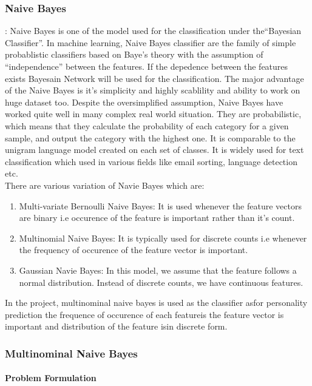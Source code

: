 \subsubsection{ Naive Bayes}: 
Naive Bayes is one of the model used for the classification under the``Bayesian Classifier''. In machine learning, Naive Bayes classifier are the family of simple probablistic classifiers based on Baye's theory with the assumption of ``independence'' between the features. If the depedence between the features exists Bayesain Network will be used for the classification. The major advantage of the Naive Bayes is it's simplicity and highly scablility and ability to work on huge dataset too. Despite the oversimplified assumption, Naive Bayes have worked quite well in many complex real world situation.
They are probabilistic, which means that they calculate the probability of each category for a given sample, and output the category with the highest one. It is comparable to the unigram language model created on each set of classes. It is widely used for text classification which used in various fields like email sorting, language detection etc. \\
There are various variation of Navie Bayes which are:
\begin{enumerate}
\item Multi-variate Bernoulli Naive Bayes: It is used whenever the feature vectors are binary i.e occurence of the feature is important rather than it's count.
\item Multinomial Naive Bayes: It is typically used for discrete counts i.e whenever the frequency of occurence of the feature vector is important.
\item Gaussian Navie Bayes: In this model, we assume that the feature follows a normal distribution. Instead of discrete counts, we have continuous features.
\end{enumerate}
In the project, multinominal naive bayes is used as the classifier asfor personality prediction the frequence of occurence of each featureis the feature vector is important and distribution of the feature isin discrete form.

\subsubsection{Multinominal Naive Bayes}
\paragraph{Problem Formulation}\hfill 

